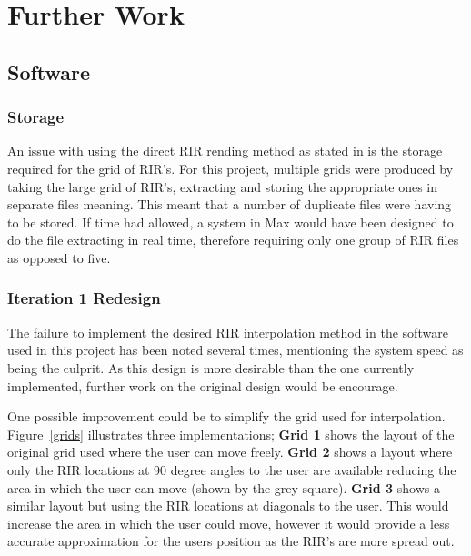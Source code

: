\documentclass[../../main.tex]{subfiles}
\begin{document}
\section{Further Work}
\label{futherwork}
	
	\subsection{Software}
		\subsubsection{Storage}
			An issue with using the direct \ac{RIR} rending method as stated in \cite{Savioja1999} is the storage required for the grid of \ac{RIR}'s. For this project, multiple grids were produced by taking the large grid of \ac{RIR}'s, extracting and storing the appropriate ones in separate files meaning. This meant that a number of duplicate files were having to be stored. If time had allowed, a system in Max would have been designed to do the file extracting in real time, therefore requiring only one group of \ac{RIR} files as opposed to five. 

		\subsubsection{Iteration 1 Redesign}
			The failure to implement the desired \ac{RIR} interpolation method in the software used in this project has been noted several times, mentioning the system speed as being the culprit. As this design is more desirable than the one currently implemented, further work on the original design would be encourage.

			One possible improvement could be to simplify the grid used for interpolation. Figure~\ref{grids} illustrates three implementations; \textbf{Grid 1} shows the layout of the original grid used where the user can move freely. \textbf{Grid 2} shows a layout where only the \ac{RIR} locations at 90 degree angles to the user are available reducing the area in which the user can move (shown by the grey square). \textbf{Grid 3} shows a similar layout but using the \ac{RIR} locations at diagonals to the user. This would increase the area in which the user could move, however it would provide a less accurate approximation for the users position as the \ac{RIR}'s are more spread out.
\end{document}
